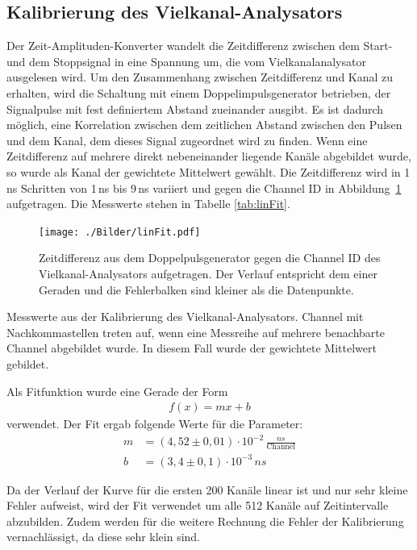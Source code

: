 \subsection{Kalibrierung des Vielkanal-Analysators}
Der Zeit-Amplituden-Konverter wandelt die Zeitdifferenz zwischen dem Start- und dem Stoppsignal in eine Spannung um, die vom Vielkanalanalysator ausgelesen wird. Um den Zusammenhang zwischen Zeitdifferenz und Kanal zu erhalten, wird die Schaltung mit einem Doppelimpulsgenerator betrieben, der Signalpulse mit fest definiertem Abstand zueinander ausgibt. Es ist dadurch möglich, eine Korrelation zwischen dem zeitlichen Abstand zwischen den Pulsen und dem Kanal, dem dieses Signal zugeordnet wird zu finden. Wenn eine Zeitdifferenz auf mehrere direkt nebeneinander liegende Kanäle abgebildet wurde, so wurde als Kanal der gewichtete Mittelwert gewählt. Die Zeitdifferenz wird in 1\,\si{ns} Schritten von 1\,ns bis 9\,ns variiert und gegen die Channel ID in \mbox{Abbildung \ref{fig:linFit}} aufgetragen. Die Messwerte stehen in Tabelle \ref{tab:linFit}.

\begin{figure}[H]
	\texttt{[image: ./Bilder/linFit.pdf]}
	\caption{Zeitdifferenz aus dem Doppelpulsgenerator gegen die Channel ID des Vielkanal-Analysators aufgetragen. Der Verlauf entspricht dem einer Geraden und die Fehlerbalken sind kleiner als die Datenpunkte.}
	\label{fig:linFit}
\end{figure}

\begin{table}[htbp]
	
	\caption{Messwerte aus der Kalibrierung des Vielkanal-Analysators. Channel mit Nachkommastellen treten auf, wenn eine Messreihe auf mehrere benachbarte Channel abgebildet wurde. In diesem Fall wurde der gewichtete Mittelwert gebildet.}
	\label{tab:linFit}
\end{table}

Als Fitfunktion wurde eine Gerade der Form
\begin{align}
	f(x) = mx + b
	\label{eq:vielkanal}
\end{align}
verwendet. Der Fit ergab folgende Werte für die Parameter:
\begin{align}
	m &= (4,52 \pm 0,01) \cdot10^{-2} \,\frac{\si{ns}}{\text{Channel}}\\ 
	b &= (3,4 \pm 0,1) \cdot 10^{-3}\, \si{ns}
\end{align}

Da der Verlauf der Kurve für die ersten 200 Kanäle linear ist und nur sehr kleine Fehler aufweist, wird der Fit verwendet um alle 512 Kanäle auf Zeitintervalle abzubilden. Zudem werden für die weitere Rechnung die Fehler der Kalibrierung vernachlässigt, da diese sehr klein sind.


